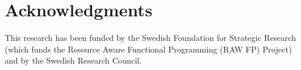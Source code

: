 

\section*{Acknowledgments} %
This research has been funded by the Swedish Foundation for
Strategic Research (which funds the Resource Aware Functional 
Programming (RAW FP) Project) and by the Swedish Research Council.


%







